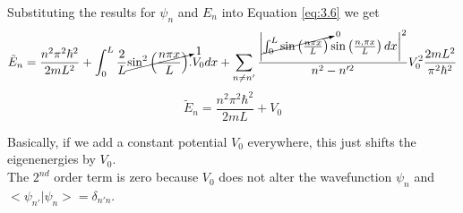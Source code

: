 \documentclass[12pt]{article}
\begin{document}
Substituting the results for $\psi_n$ and $E_n$  into Equation \ref{eq:3.6} we get 
\begin{equation*}
	\tilde{E}_n = \frac{n^2 \pi^2 \hbar^2}{2mL^2} +\int_{0}^{L} \frac{2}{L} \cancelto{1}{\sin^2 
		\left(\frac{n \pi x}{L} \right)}.V_0 dx + \sum_{n\neq n'} \frac{\bigg|\cancelto{0}{\int_{0}^{L} \sin 
	\left(\frac{n\pi x}{L}\right)} \sin \left(\frac{n, \pi x}{L}\right)dx \bigg|^2}{n^2 - n'^2} V^2_0 
	\frac{2m L^2}{\pi^2 \hbar^2}
\end{equation*}
\begin{equation}
  \label{eq:3.7}
	\boxed{\tilde{E}_n  = \frac{n^2 \pi^2 \hbar^2}{2mL} + V_0 }
\end{equation}

Basically, if we add a constant potential $V_0$ everywhere, this just shifts the eigenenergies 
by $V_0$. \\

The $2^{nd}$ order term is zero because $V_0$ does not alter the wavefunction $\psi_n$ and 
$\big<\psi_{n'}\big|\psi_n \big > = \delta_{n'n}$.
\end{document}
